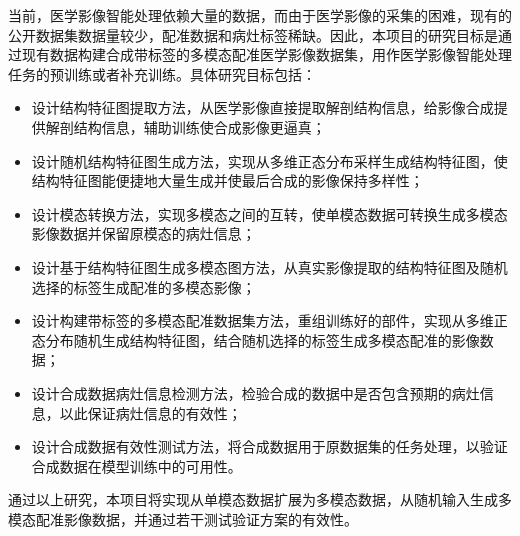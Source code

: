 \documentclass[letterpaper]{article} %
\begin{document}
当前，医学影像智能处理依赖大量的数据，而由于医学影像的采集的困难，现有的公开数据集数据量较少，配准数据和病灶标签稀缺。因此，本项目的研究目标是通过现有数据构建合成带标签的多模态配准医学影像数据集，用作医学影像智能处理任务的预训练或者补充训练。具体研究目标包括：
\begin{itemize}
	\item 设计结构特征图提取方法，从医学影像直接提取解剖结构信息，给影像合成提供解剖结构信息，辅助训练使合成影像更逼真；
	\item 设计随机结构特征图生成方法，实现从多维正态分布采样生成结构特征图，使结构特征图能便捷地大量生成并使最后合成的影像保持多样性；
	\item 设计模态转换方法，实现多模态之间的互转，使单模态数据可转换生成多模态影像数据并保留原模态的病灶信息；
	\item 设计基于结构特征图生成多模态图方法，从真实影像提取的结构特征图及随机选择的标签生成配准的多模态影像；
	\item 设计构建带标签的多模态配准数据集方法，重组训练好的部件，实现从多维正态分布随机生成结构特征图，结合随机选择的标签生成多模态配准的影像数据；
	\item 设计合成数据病灶信息检测方法，检验合成的数据中是否包含预期的病灶信息，以此保证病灶信息的有效性；
	\item 设计合成数据有效性测试方法，将合成数据用于原数据集的任务处理，以验证合成数据在模型训练中的可用性。
\end{itemize}	
通过以上研究，本项目将实现从单模态数据扩展为多模态数据，从随机输入生成多模态配准影像数据，并通过若干测试验证方案的有效性。




\end{document}
